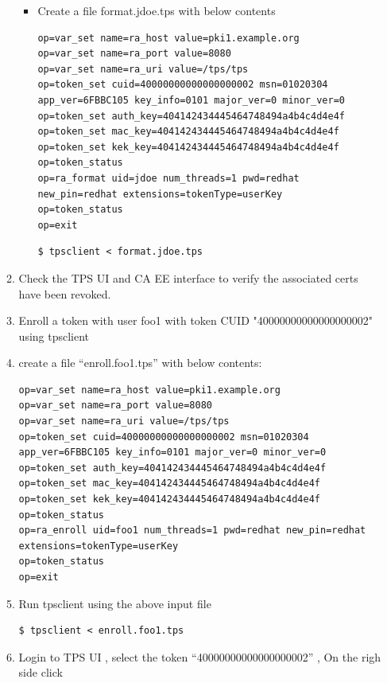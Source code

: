 \documentclass[a4paper]{article}
\begin{document}
\begin{enumerate}[label*=\arabic*.]
\begin{enumerate}[label*=\arabic*.]
\begin{itemize}
                    \item \label{token_ex10} Create a file format.jdoe.tps with below contents
                        \begin{lstlisting}
op=var_set name=ra_host value=pki1.example.org
op=var_set name=ra_port value=8080
op=var_set name=ra_uri value=/tps/tps
op=token_set cuid=40000000000000000002 msn=01020304 app_ver=6FBBC105 key_info=0101 major_ver=0 minor_ver=0
op=token_set auth_key=404142434445464748494a4b4c4d4e4f
op=token_set mac_key=404142434445464748494a4b4c4d4e4f
op=token_set kek_key=404142434445464748494a4b4c4d4e4f
op=token_status
op=ra_format uid=jdoe num_threads=1 pwd=redhat new_pin=redhat extensions=tokenType=userKey
op=token_status
op=exit
                        \end{lstlisting}
                        \begin{lstlisting}[style=bashInputStyle]
$ tpsclient < format.jdoe.tps
                        \end{lstlisting}
                \end{itemize}
            \item \label{token_ex10} Check the TPS UI and CA EE interface to verify the associated certs have been revoked. 
            \item \label{token_ex11} Enroll a token with user foo1 with token CUID "40000000000000000002" using tpsclient
                    \item create a file ``enroll.foo1.tps'' with below contents:
                        \begin{lstlisting}[style=configFile]
op=var_set name=ra_host value=pki1.example.org
op=var_set name=ra_port value=8080
op=var_set name=ra_uri value=/tps/tps
op=token_set cuid=40000000000000000002 msn=01020304 app_ver=6FBBC105 key_info=0101 major_ver=0 minor_ver=0
op=token_set auth_key=404142434445464748494a4b4c4d4e4f
op=token_set mac_key=404142434445464748494a4b4c4d4e4f
op=token_set kek_key=404142434445464748494a4b4c4d4e4f
op=token_status
op=ra_enroll uid=foo1 num_threads=1 pwd=redhat new_pin=redhat extensions=tokenType=userKey
op=token_status
op=exit
                        \end{lstlisting}
                    \item Run tpsclient using the above input file 
                        \begin{lstlisting}[style=bashInputStyle]
$ tpsclient < enroll.foo1.tps
                        \end{lstlisting}
                    \item \label{token_ex12} Login to TPS UI , select the token ``40000000000000000002'' , On the righ side click 

\end{enumerate}
\end{enumerate}
\end{document}
